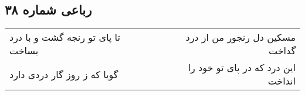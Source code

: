 \begin{center}
\section*{رباعی شماره ۳۸}
\label{sec:sh038}
\begin{longtable}{l p{0.5cm} r}
تا پای تو رنجه گشت و با درد بساخت
&&
مسکین دل رنجور من از درد گداخت
\\
گویا که ز روز گار دردی دارد
&&
این درد که در پای تو خود را انداخت
\\
\end{longtable}
\end{center}
